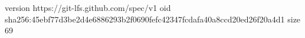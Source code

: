 version https://git-lfs.github.com/spec/v1
oid sha256:45ebf77d3be2d4e6886293b2f0690fefc42347fcdafa40a8ccd20ed26f20a4d1
size 69
